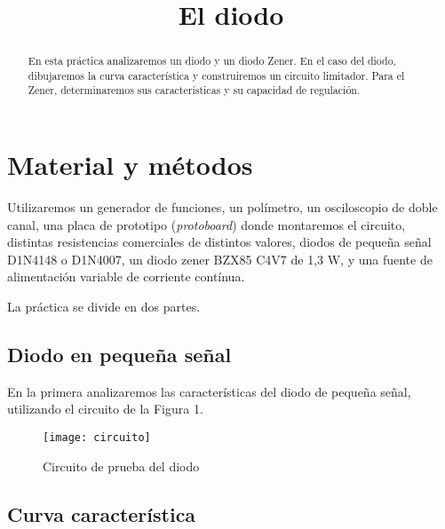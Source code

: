 \documentclass[a4paper,12pt,spanish]{article}
\begin{document}
\title{El diodo}

\date{}

\maketitle



\begin{abstract} %

En esta práctica analizaremos un diodo y un diodo Zener. En el caso del diodo, dibujaremos la curva característica y construiremos un circuito limitador. Para el Zener, determinaremos sus características y su capacidad de regulación.



\end{abstract}




\section{Material y métodos}

Utilizaremos un generador de funciones, un polímetro, un osciloscopio de doble canal, una placa de prototipo (\textit{protoboard}) donde montaremos el circuito, distintas resistencias comerciales de distintos valores, diodos de pequeña señal D1N4148 o D1N4007, un diodo zener BZX85 C4V7 de 1,3 W, y una fuente de alimentación variable de corriente contínua.

La práctica se divide en dos partes. 

\subsection{Diodo en pequeña señal}

En la primera analizaremos las características del diodo de pequeña señal, utilizando el circuito de la Figura 1.

\begin{figure}[H]
	\centering
	\texttt{[image: circuito]}
	\caption{Circuito de prueba del diodo}
	\label{fig:circuito}
\end{figure}

\subsection*{Curva característica}
\end{document}

